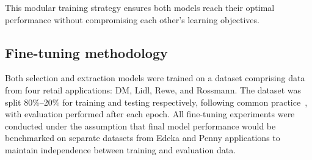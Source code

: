 \documentclass[licencjacka,en]{pracamgr}
\begin{document}
This modular training strategy ensures both models reach their optimal performance without compromising each other's learning objectives.
\subsection{Fine-tuning methodology}
Both selection and extraction models were trained on a dataset comprising data from four retail applications: DM, Lidl, Rewe, and Rossmann. The dataset was split 80\%--20\% for training and testing respectively, following common practice~\cite{pp}, with evaluation performed after each epoch. All fine-tuning experiments were conducted under the assumption that final model performance would be benchmarked on separate datasets from Edeka and Penny applications to maintain independence between training and evaluation data.
\end{document}
